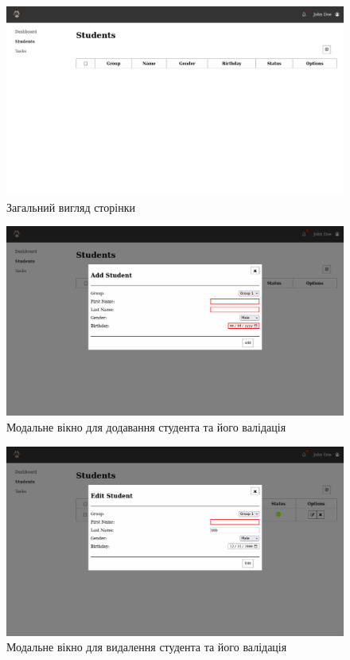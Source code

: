 \documentclass{article}
\begin{document}
\begin{normalsize}
\begin{figure}[H]
	\centering
	\includegraphics[scale=0.35]{1}
	\caption{Загальний вигляд сторінки}
\end{figure}

\begin{figure}[H]
	\centering
	\includegraphics[scale=0.35]{3}
	\caption{Модальне вікно для додавання студента та його валідація}
\end{figure}

\begin{figure}[H]
	\centering
	\includegraphics[scale=0.35]{6}
	\caption{Модальне вікно для видалення студента та його валідація}
\end{figure}


\end{normalsize}
\end{document}
